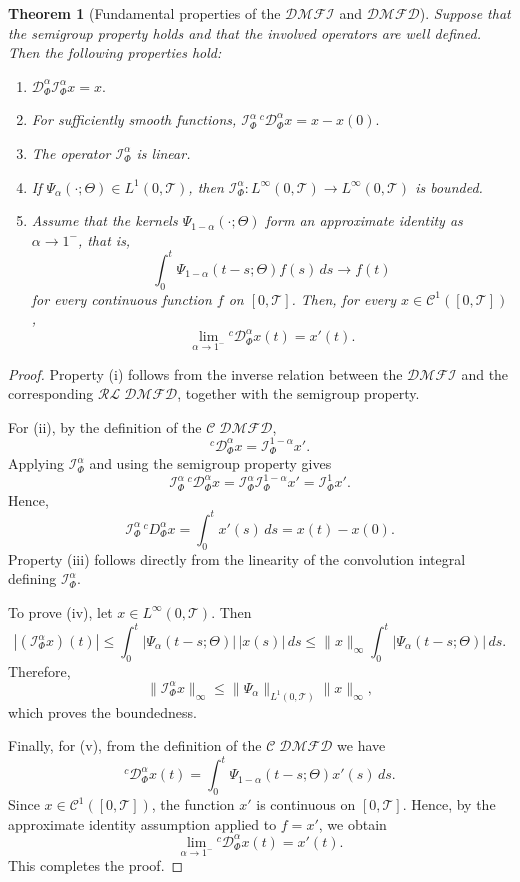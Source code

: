 \documentclass[10pt,a4paper]{amsart}
\newtheorem{theorem}{Theorem}
\begin{document}
\begin{theorem}[Fundamental properties of the $\mathcal{DMFI}$ and $\mathcal{DMFD}$]
Suppose that the semigroup property holds and that the involved operators are well defined.
Then the following properties hold:
\begin{enumerate}[label=(\roman*),itemsep=2pt,topsep=2pt]
\item
\(
\mathcal D_\Phi^\alpha \mathcal I_\Phi^\alpha x=x.
\)

\item
For sufficiently smooth functions,
\(
\mathcal I_\Phi^\alpha\,{}^c \mathcal D_\Phi^\alpha x=x-x(0).
\)

\item
The operator \(\mathcal I_\Phi^\alpha\) is linear.

\item
If \(\Psi_\alpha(\cdot;\Theta)\in L^1(0,\mathcal{T})\), then
\(
\mathcal I_\Phi^\alpha:L^\infty(0,\mathcal{T})\to L^\infty(0,\mathcal{T})
\)
is bounded.

\item
Assume that the kernels \(\Psi_{1-\alpha}(\cdot;\Theta)\) form an approximate identity as
\(\alpha\to1^{-}\), that is,
\[
\int_0^t \Psi_{1-\alpha}(t-s;\Theta)f(s)\,ds \longrightarrow f(t)
\]
for every continuous function \(f\) on \([0,\mathcal{T}]\). Then, for every \(x\in \mathcal{C}^1([0,\mathcal{T}])\),
\[
\lim_{\alpha\to1^-}{}^c \mathcal{D}_\Phi^\alpha x(t)=x'(t).
\]
\end{enumerate}
\end{theorem}

\begin{proof}
Property (i) follows from the inverse relation between the $\mathcal{DMFI}$ and the corresponding $\mathcal{RL\;DMFD}$, together
with the semigroup property.

For (ii), by the definition of the $\mathcal{C\;DMFD}$,
\[
{}^c \mathcal D_\Phi^\alpha x=\mathcal I_\Phi^{1-\alpha}x'.
\]
Applying \( \mathcal I_\Phi^\alpha\) and using the semigroup property gives
\[
\mathcal I_\Phi^\alpha\,{}^c \mathcal D_\Phi^\alpha x
=
\mathcal I_\Phi^\alpha \mathcal I_\Phi^{1-\alpha}x'
=
\mathcal I_\Phi^1x'.
\]
Hence,
\[
\mathcal I_\Phi^\alpha\,{}^cD_\Phi^\alpha x
=
\int_0^t x'(s)\,ds
=
x(t)-x(0).
\]
Property (iii) follows directly from the linearity of the convolution integral defining
\(\mathcal I_\Phi^\alpha\).

To prove (iv), let \(x\in L^\infty(0,\mathcal T)\). Then
\[
|(\mathcal I_\Phi^\alpha x)(t)|
\le
\int_0^t |\Psi_\alpha(t-s;\Theta)|\,|x(s)|\,ds
\le
\|x\|_\infty \int_0^t |\Psi_\alpha(t-s;\Theta)|\,ds.
\]
Therefore,
\[
\|\mathcal I_\Phi^\alpha x\|_\infty
\le
\|\Psi_\alpha\|_{L^1(0,\mathcal T)}\|x\|_\infty,
\]
which proves the boundedness.

Finally, for (v), from the definition of the $\mathcal{C\;DMFD}$ we have
\[
{}^c \mathcal D_\Phi^\alpha x(t)
=
\int_0^t \Psi_{1-\alpha}(t-s;\Theta)x'(s)\,ds.
\]
Since \(x\in \mathcal C^1([0,\mathcal T])\), the function \(x'\) is continuous on \([0,\mathcal T]\). Hence, by the
approximate identity assumption applied to \(f=x'\), we obtain
\[
\lim_{\alpha\to1^-}{}^c \mathcal D_\Phi^\alpha x(t)
=
x'(t).
\]
This completes the proof.
\end{proof}
\end{document}
